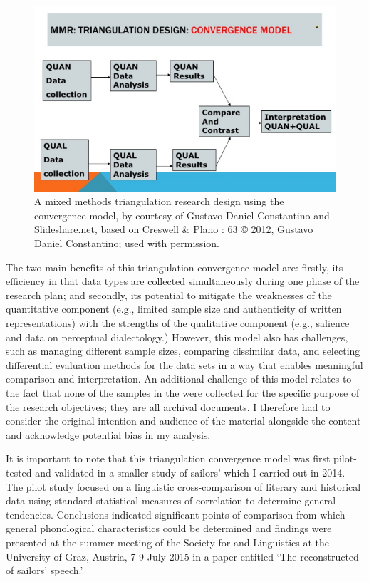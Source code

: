 \begin{figure} 
\includegraphics[width=\textwidth]{figures/delgado-img1.png}
\caption{\label{fig:key:1.1} A mixed methods triangulation research design using the convergence model, by courtesy of Gustavo Daniel Constantino and Slideshare.net, based on Creswell \& Plano \citealt{Clark2007}: 63 © 2012, Gustavo Daniel Constantino; used with permission. }
\end{figure}



The two main benefits of this triangulation convergence model are: firstly, its efficiency in that data types are collected simultaneously during one phase of the research plan; and secondly, its potential to mitigate the weaknesses of the quantitative component (e.g., limited sample size and authenticity of written representations) with the strengths of the qualitative component (e.g., salience and data on perceptual dialectology.) However, this model also has challenges, such as managing different sample sizes, comparing dissimilar data, and selecting differential evaluation methods for the data sets in a way that enables meaningful comparison and interpretation. An additional challenge of this model relates to the fact that none of the samples in the  were collected for the specific purpose of the research objectives; they are all archival documents. I therefore had to consider the original intention and audience of the material alongside the content and acknowledge potential bias in my analysis. 



It is important to note that this triangulation convergence model was first pilot-tested and validated in a smaller study of sailors’  which I carried out in 2014. The pilot study focused on a linguistic cross-comparison of literary and historical data using standard statistical measures of correlation to determine general tendencies. Conclusions indicated significant points of comparison from which general phonological characteristics could be determined and findings were presented at the summer meeting of the Society for  and  Linguistics at the University of Graz, Austria, 7-9 July {2015} in a paper entitled ‘The reconstructed  of  sailors’ speech.’



